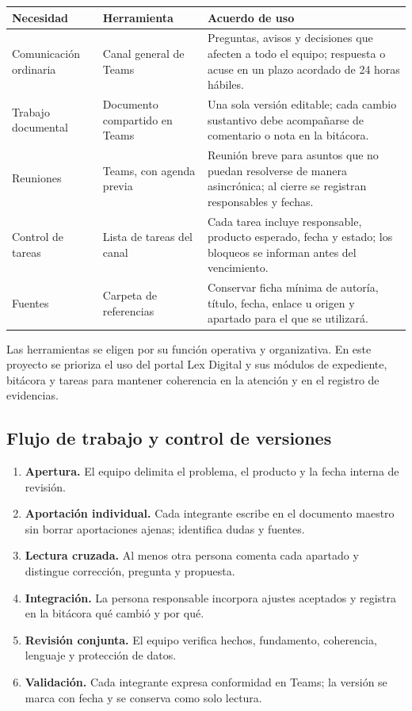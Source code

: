 \documentclass[
  spanish,
  letterpaper, oneside
]{article}
\begin{document}
\begin{longtable}{p{3.1cm}p{4.2cm}p{6.1cm}}
\toprule
\textbf{Necesidad} & \textbf{Herramienta} & \textbf{Acuerdo de uso} \\
\midrule
Comunicación ordinaria & Canal general de Teams & Preguntas, avisos y decisiones que afecten a todo el equipo; respuesta o acuse en un plazo acordado de 24 horas hábiles. \\
Trabajo documental & Documento compartido en Teams & Una sola versión editable; cada cambio sustantivo debe acompañarse de comentario o nota en la bitácora. \\
Reuniones & Teams, con agenda previa & Reunión breve para asuntos que no puedan resolverse de manera asincrónica; al cierre se registran responsables y fechas. \\
Control de tareas & Lista de tareas del canal & Cada tarea incluye responsable, producto esperado, fecha y estado; los bloqueos se informan antes del vencimiento. \\
Fuentes & Carpeta de referencias & Conservar ficha mínima de autoría, título, fecha, enlace u origen y apartado para el que se utilizará. \\
\bottomrule
\end{longtable}

Las herramientas se eligen por su función operativa y organizativa. En este proyecto
se prioriza el uso del portal Lex Digital y sus módulos de expediente, bitácora y tareas
para mantener coherencia en la atención y en el registro de evidencias.

\subsection{Flujo de trabajo y control de versiones}

\begin{enumerate}
  \item \textbf{Apertura.} El equipo delimita el problema, el producto y la fecha interna de revisión.
  \item \textbf{Aportación individual.} Cada integrante escribe en el documento maestro sin borrar aportaciones ajenas; identifica dudas y fuentes.
  \item \textbf{Lectura cruzada.} Al menos otra persona comenta cada apartado y distingue corrección, pregunta y propuesta.
  \item \textbf{Integración.} La persona responsable incorpora ajustes aceptados y registra en la bitácora qué cambió y por qué.
  \item \textbf{Revisión conjunta.} El equipo verifica hechos, fundamento, coherencia, lenguaje y protección de datos.
  \item \textbf{Validación.} Cada integrante expresa conformidad en Teams; la versión se marca con fecha y se conserva como solo lectura.
\end{enumerate}
\end{document}
